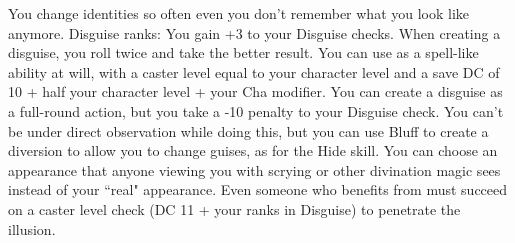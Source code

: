 \skillfeat
{You change identities so often even you don't remember what you look like anymore.}
{Disguise ranks:}
{You gain +3 to your Disguise checks.}
{When creating a disguise, you roll twice and take the better result.}
{You can use  as a spell-like ability at will, with a caster level equal to your character level and a save DC of 10 + half your character level + your Cha modifier.}
{You can create a disguise as a full-round action, but you take a -10 penalty to your Disguise check. You can't be under direct observation while doing this, but you can use Bluff to create a diversion to allow you to change guises, as for the Hide skill.}
{You can choose an appearance that anyone viewing you with scrying or other divination magic sees instead of your ``real" appearance. Even someone who benefits from  must succeed on a caster level check (DC 11 + your ranks in Disguise) to penetrate the illusion.}